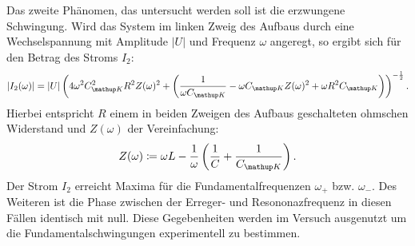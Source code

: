 Das zweite Phänomen, das untersucht werden soll ist die erzwungene Schwingung.
Wird das System im linken Zweig des Aufbaus durch eine Wechselspannung mit Amplitude $\left| U \right|$ und Frequenz $\omega$ angeregt, so ergibt sich für den Betrag des
Stroms $I_2$:
\begin{equation}
|I_2(\omega)| = |U| \left( 4 \omega^2 C\ua{K}^2 R^2 Z(\omega )^2 + \left(\frac{1}{\omega C\ua{K}} - \omega C\ua{K} Z(\omega )^2 + \omega R^2 C\ua{K}\right)\right)^{-\frac{1}{2}}.
\label{eq: I_2(omega)}
\end{equation}
Hierbei entspricht $R$ einem in beiden Zweigen des Aufbaus geschalteten ohmschen Widerstand und $Z(\omega)$ der Vereinfachung:
\begin{equation}
  Z(\omega ) \coloneqq \omega L - \frac{1}{\omega } \left(\frac{1}{C} + \frac{1}{C\ua{K}}\right).
\end{equation}
Der Strom $I_2$ erreicht Maxima für die Fundamentalfrequenzen $\omega_+$ bzw. $\omega_-$. Des Weiteren ist die Phase zwischen der Erreger-
und Resononazfrequenz in diesen Fällen identisch mit null. Diese Gegebenheiten werden im Versuch ausgenutzt um
die Fundamentalschwingungen experimentell zu bestimmen.
